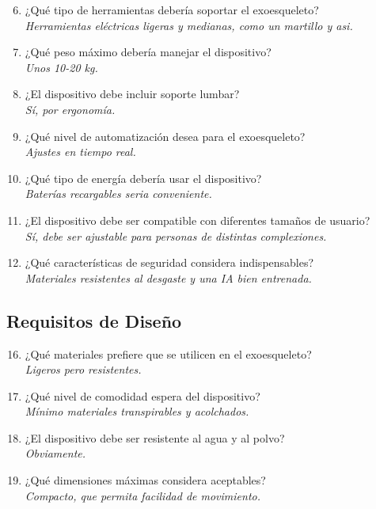 \begin{enumerate}
    \setcounter{enumi}{5}
    \item ¿Qué tipo de herramientas debería soportar el exoesqueleto? \\
    \textit{Herramientas eléctricas ligeras y medianas, como un martillo y asi.}
    
    \item ¿Qué peso máximo debería manejar el dispositivo? \\
    \textit{Unos 10-20 kg.}
    
    \item ¿El dispositivo debe incluir soporte lumbar? \\
    \textit{Sí, por ergonomía.}
    
    \item ¿Qué nivel de automatización desea para el exoesqueleto? \\
    \textit{Ajustes en tiempo real.}
        
    \item ¿Qué tipo de energía debería usar el dispositivo? \\
    \textit{Baterías recargables seria conveniente.}
    
    \item ¿El dispositivo debe ser compatible con diferentes tamaños de usuario? \\
    \textit{Sí, debe ser ajustable para personas de distintas complexiones.}
    
    \item ¿Qué características de seguridad considera indispensables? \\
    \textit{Materiales resistentes al desgaste y una IA bien entrenada.}
\end{enumerate}

\subsection{Requisitos de Diseño}

\begin{enumerate}
    \setcounter{enumi}{15}
    \item ¿Qué materiales prefiere que se utilicen en el exoesqueleto? \\
    \textit{Ligeros pero resistentes.}
    
    \item ¿Qué nivel de comodidad espera del dispositivo? \\
    \textit{Mínimo materiales transpirables y acolchados.}
    
    \item ¿El dispositivo debe ser resistente al agua y al polvo? \\
    \textit{Obviamente.}
    
    \item ¿Qué dimensiones máximas considera aceptables? \\
    \textit{Compacto, que permita facilidad de movimiento.}
\end{enumerate}

